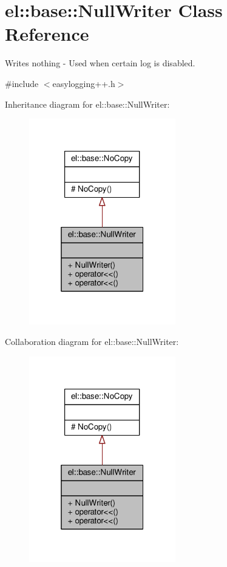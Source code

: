 \hypertarget{classel_1_1base_1_1NullWriter}{}\section{el\+:\+:base\+:\+:Null\+Writer Class Reference}
\label{classel_1_1base_1_1NullWriter}


Writes nothing -\/ Used when certain log is disabled.  




{\ttfamily \#include $<$easylogging++.\+h$>$}



Inheritance diagram for el\+:\+:base\+:\+:Null\+Writer\+:
\nopagebreak
\begin{figure}[H]
\begin{center}
\leavevmode
\includegraphics[width=181pt]{da/d11/classel_1_1base_1_1NullWriter__inherit__graph}
\end{center}
\end{figure}


Collaboration diagram for el\+:\+:base\+:\+:Null\+Writer\+:
\nopagebreak
\begin{figure}[H]
\begin{center}
\leavevmode
\includegraphics[width=181pt]{d3/d39/classel_1_1base_1_1NullWriter__coll__graph}
\end{center}
\end{figure}

